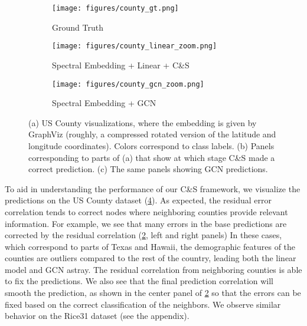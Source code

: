 \documentclass{article}
\newcommand{\framework}{C\&S}
\begin{document}
\begin{figure}[t]
    \centering
    \begin{subfigure}{.5\linewidth}
      \centering
      \texttt{[image: figures/county\_gt.png]}
      \caption{Ground Truth}
      \label{fig:sub1}
    \end{subfigure}\begin{minipage}{.5\textwidth}
        \centering
         \begin{subfigure}{\linewidth}
        \texttt{[image: figures/county\_linear\_zoom.png]}
        \caption{Spectral Embedding + Linear + \framework}
        \label{fig:sub2}
        \end{subfigure}

        \begin{subfigure}{\linewidth}
        \texttt{[image: figures/county\_gcn\_zoom.png]}
        \caption{Spectral Embedding + GCN}
        \label{fig:sub3}
        \end{subfigure}\end{minipage}\caption{(a) US County visualizations, where the embedding is given by GraphViz (roughly, a compressed rotated version of the latitude and longitude coordinates). 
    Colors correspond to class labels.
    (b) Panels corresponding to parts of (a) that show at which stage \framework{} made a correct prediction.
    (c) The same panels showing GCN predictions. 
    }
    \label{fig:county_vis}
\end{figure}

To aid in understanding the performance of our \framework{} framework, we visualize the predictions on the US County dataset (\cref{fig:county_vis}).
As expected, the residual error correlation tends to correct nodes where neighboring counties provide relevant information.
For example, we see that many errors in the base predictions are corrected by the residual correlation (\cref{fig:sub2}, left and right panels)
In these cases, which correspond to parts of Texas and Hawaii,
the demographic features of the counties are outliers compared to the rest of the country, leading both the linear model and GCN astray.
The residual correlation from neighboring counties is able to fix the predictions.
We also see that the final prediction correlation will smooth the prediction, as shown in the center panel of \cref{fig:sub2}
so that the errors can be fixed based on the correct classification of the neighbors.
We observe similar behavior on the Rice31 dataset (see the appendix).
\end{document}
